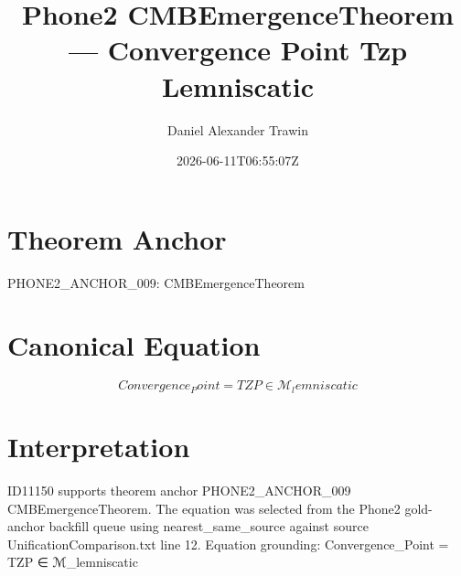 \documentclass[11pt]{article}
\title{Phone2 CMBEmergenceTheorem — Convergence Point Tzp Lemniscatic}
\author{Daniel Alexander Trawin}
\date{2026-06-11T06:55:07Z}
\begin{document}
\maketitle
\section*{Theorem Anchor}
PHONE2_ANCHOR_009: CMBEmergenceTheorem
\section*{Canonical Equation}
\[
Convergence_Point = TZP ∈ ℳ_lemniscatic
\]
\section*{Interpretation}
ID11150 supports theorem anchor PHONE2_ANCHOR_009 CMBEmergenceTheorem. The equation was selected from the Phone2 gold-anchor backfill queue using nearest_same_source against source UnificationComparison.txt line 12. Equation grounding: Convergence_Point = TZP ∈ ℳ_lemniscatic
\end{document}

